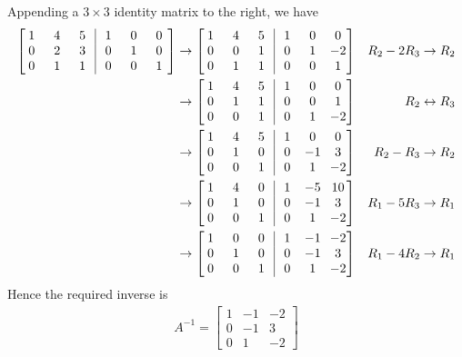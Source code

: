 \begin{solution}
Appending a $3 \times 3$ identity matrix to the right, we have
\begin{align*} 
\left[\begin{array}{@{}wc{10pt}wc{10pt}wc{10pt}|wc{10pt}wc{10pt}wc{10pt}@{\,}}
1 & 4 & 5 & 1 & 0 & 0 \\
0 & 2 & 3 & 0 & 1 & 0 \\
0 & 1 & 1 & 0 & 0 & 1
\end{array}\right] 
& \to
\left[\begin{array}{@{}wc{10pt}wc{10pt}wc{10pt}|wc{10pt}wc{10pt}wc{10pt}@{\,}}
1 & 4 & 5 & 1 & 0 & 0 \\
0 & 0 & 1 & 0 & 1 & -2 \\
0 & 1 & 1 & 0 & 0 & 1
\end{array}\right] & R_2 - 2R_3 \to R_2 \\
& \to
\left[\begin{array}{@{}wc{10pt}wc{10pt}wc{10pt}|wc{10pt}wc{10pt}wc{10pt}@{\,}}
1 & 4 & 5 & 1 & 0 & 0 \\
0 & 1 & 1 & 0 & 0 & 1 \\
0 & 0 & 1 & 0 & 1 & -2 
\end{array}\right] & R_2 \leftrightarrow R_3 \\
& \to
\left[\begin{array}{@{}wc{10pt}wc{10pt}wc{10pt}|wc{10pt}wc{10pt}wc{10pt}@{\,}}
1 & 4 & 5 & 1 & 0 & 0 \\
0 & 1 & 0 & 0 & -1 & 3 \\
0 & 0 & 1 & 0 & 1 & -2 
\end{array}\right] & R_2 - R_3 \to R_2 \\
& \to
\left[\begin{array}{@{}wc{10pt}wc{10pt}wc{10pt}|wc{10pt}wc{10pt}wc{10pt}@{\,}}
1 & 4 & 0 & 1 & -5 & 10 \\
0 & 1 & 0 & 0 & -1 & 3 \\
0 & 0 & 1 & 0 & 1 & -2 
\end{array}\right] & R_1 - 5R_3 \to R_1 \\
& \to
\left[\begin{array}{@{}wc{10pt}wc{10pt}wc{10pt}|wc{10pt}wc{10pt}wc{10pt}@{\,}}
1 & 0 & 0 & 1 & -1 & -2 \\
0 & 1 & 0 & 0 & -1 & 3 \\
0 & 0 & 1 & 0 & 1 & -2 
\end{array}\right] & R_1 - 4R_2 \to R_1 
\end{align*}
Hence the required inverse is
\begin{align*}
A^{-1} =
\begin{bmatrix}
1 & -1 & -2 \\
0 & -1 & 3 \\
0 & 1 & -2 
\end{bmatrix}    
\end{align*}
\end{solution}
